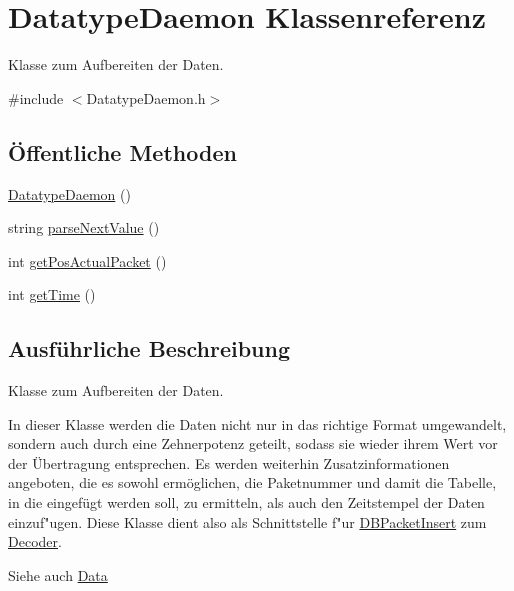 \hypertarget{classDatatypeDaemon}{\section{Datatype\-Daemon Klassenreferenz}
\label{classDatatypeDaemon}
}


Klasse zum Aufbereiten der Daten.  




{\ttfamily \#include $<$Datatype\-Daemon.\-h$>$}

\subsection*{Öffentliche Methoden}
\begin{DoxyCompactItemize}
\item 
\hyperlink{classDatatypeDaemon_ad7a47d928c863d8ba26d840a8c96913f}{Datatype\-Daemon} ()
\item 
string \hyperlink{classDatatypeDaemon_a4b664832a3dcb05ad6f7c039573d8327}{parse\-Next\-Value} ()
\item 
int \hyperlink{classDatatypeDaemon_adfee8d7c9d970d0c3b5c867465f0a092}{get\-Pos\-Actual\-Packet} ()
\item 
int \hyperlink{classDatatypeDaemon_a3ba1b224d6d7287ca57d43d9b2452720}{get\-Time} ()
\end{DoxyCompactItemize}


\subsection{Ausführliche Beschreibung}
Klasse zum Aufbereiten der Daten. 

In dieser Klasse werden die Daten nicht nur in das richtige Format umgewandelt, sondern auch durch eine Zehnerpotenz geteilt, sodass sie wieder ihrem Wert vor der \"Ubertragung entsprechen. Es werden weiterhin Zusatzinformationen angeboten, die es sowohl erm\"oglichen, die Paketnummer und damit die Tabelle, in die eingef\"ugt werden soll, zu ermitteln, als auch den Zeitstempel der Daten einzuf"ugen. Diese Klasse dient also als Schnittstelle f"ur \hyperlink{classDBPacketInsert}{D\-B\-Packet\-Insert} zum \hyperlink{classDecoder}{Decoder}.

\begin{DoxySeeAlso}{Siehe auch}
\hyperlink{classData}{Data} 
\end{DoxySeeAlso}


